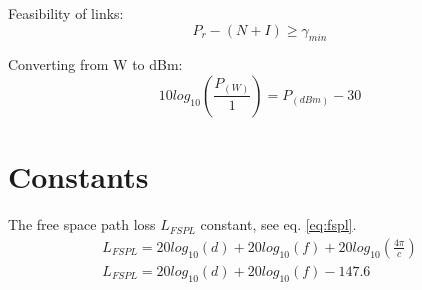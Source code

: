 Feasibility of links:
\begin{equation}
  \label{eq:feasibility:links}
  P_r - (N + I) \geq \gamma_{min}
\end{equation}

Converting from W to dBm:
\begin{equation}
  \label{eq:watt:to:dbm}
  10log_{10}\left(\frac{P_{(W)}}{1}\right) = P_{(dBm)} - 30
\end{equation}

\section{Constants}
\label{sec:Constants}
The free space path loss $L_{FSPL}$ constant, see eq. \ref{eq:fspl}.
\begin{equation}
  \label{eq:fspl}
  \begin{split}
  L_{FSPL} = 20log_{10}(d) + 20log_{10}(f) + 20log_{10}(\frac{4\pi}{c})\\
  L_{FSPL} = 20log_{10}(d) + 20log_{10}(f) -147.6
  \end{split}
\end{equation}


